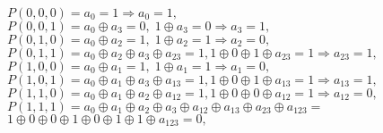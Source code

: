 \documentclass{article}
\begin{document}
	$P(0, 0, 0) = a_0 = 1 \Rightarrow a_0 = 1,$\\
	$P(0, 0, 1) = a_0 \oplus a_3 = 0, \; 1 \oplus a_3 = 0 \Rightarrow a_3 = 1,$\\
	$P(0, 1, 0) = a_0 \oplus a_2 = 1, \; 1 \oplus a_2 = 1 \Rightarrow a_2 = 0,$\\
	$P(0, 1, 1) = a_0 \oplus a_2 \oplus a_3 \oplus a_{23} = 1, 1 \oplus 0 \oplus 1 \oplus a_{23} = 1 \Rightarrow a_{23} = 1,$\\
	$P(1, 0, 0) = a_0 \oplus a_1 = 1, \; 1 \oplus a_1 = 1 \Rightarrow a_1 = 0,$\\
	$P(1, 0, 1) = a_0 \oplus a_1 \oplus a_3 \oplus a_{13} = 1, 1 \oplus 0 \oplus 1 \oplus a_{13} = 1 \Rightarrow a_{13} = 1,$\\
	$P(1, 1, 0) = a_0 \oplus a_1 \oplus a_2 \oplus a_{12} = 1, 1 \oplus 0 \oplus 0 \oplus a_{12} = 1 \Rightarrow a_{12} = 0,$\\
	$P(1, 1, 1) = a_0 \oplus a_1 \oplus a_2 \oplus a_3 \oplus a_{12} \oplus a_{13} \oplus a_{23} \oplus a_{123} =$\\
	$1 \oplus 0 \oplus 0 \oplus 1 \oplus 0 \oplus 1 \oplus 1 \oplus a_{123} = 0,$
	
\end{document}
